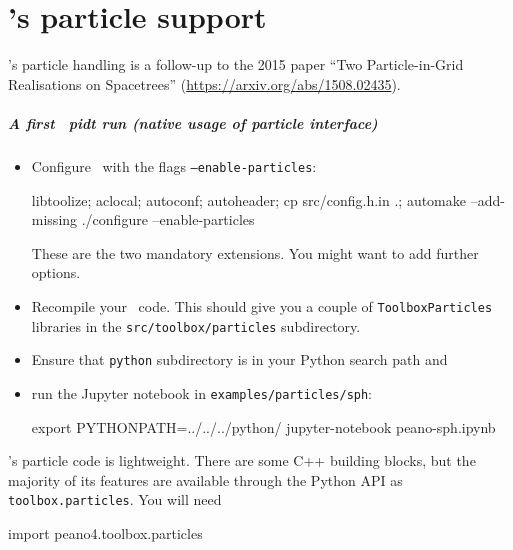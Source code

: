\chapter{\Peano's particle support}
\label{section:pidt}

\noindent
\Peano's particle handling is a follow-up to the 2015 paper ``Two Particle-in-Grid Realisations on Spacetrees'' (\url{https://arxiv.org/abs/1508.02435}).




\begin{framed}
\paragraph*{A first \Peano\ pidt run (native usage of particle interface)}
\begin{itemize}
  \item Configure \Peano\ with the flags \texttt{--enable-particles}:
  \begin{code}
libtoolize; aclocal; autoconf; autoheader; cp src/config.h.in .; automake --add-missing
./configure --enable-particles
  \end{code}
   These are the two mandatory extensions. You might want to add further options.
  \item Recompile your \Peano\ code. This should give you a couple of
  \texttt{ToolboxParticles} libraries in the \texttt{src/toolbox/particles}
  subdirectory.
  \item Ensure that \texttt{python} subdirectory is in your Python search path
  and
  \item run the Jupyter notebook in \texttt{examples/particles/sph}: 
  \begin{code}
export PYTHONPATH=../../../python/
jupyter-notebook peano-sph.ipynb
  \end{code}
\end{itemize}
\end{framed}


\noindent
\Peano's particle code is lightweight.
There are some C++ building blocks, but the majority of its features are
available through the Python API as
\texttt{toolbox.particles}.
You will need

\begin{code}
import peano4.toolbox.particles
\end{code}

